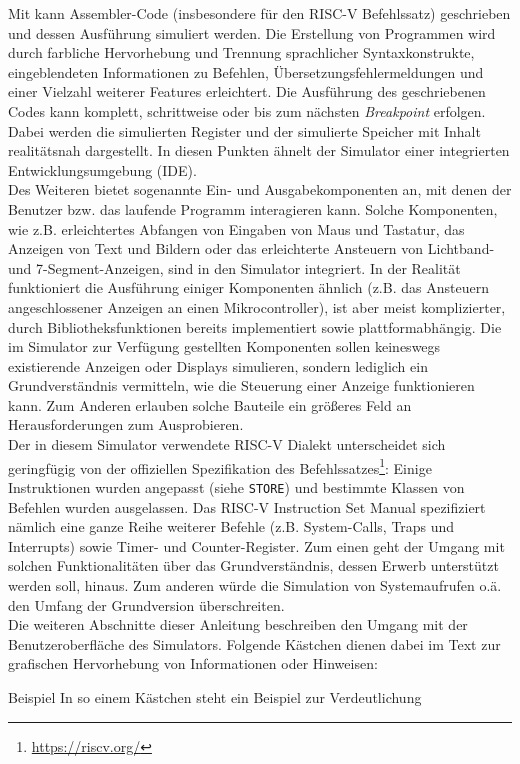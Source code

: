 Mit \erasim kann Assembler-Code (insbesondere für den RISC-V Befehlssatz)
geschrieben und dessen Ausführung simuliert werden. Die Erstellung von
Programmen wird durch farbliche Hervorhebung und Trennung sprachlicher
Syntaxkonstrukte, eingeblendeten Informationen zu Befehlen,
Übersetzungsfehlermeldungen und einer Vielzahl weiterer Features erleichtert.
Die Ausführung des geschriebenen Codes kann komplett, schrittweise oder bis zum
nächsten \emph{Breakpoint} erfolgen. Dabei werden die simulierten Register und
der simulierte Speicher mit Inhalt realitätsnah dargestellt. In diesen Punkten
ähnelt der Simulator einer integrierten Entwicklungsumgebung (IDE).\\
Des Weiteren bietet \erasim sogenannte Ein- und Ausgabekomponenten an, mit denen
der Benutzer bzw. das laufende Programm interagieren kann. Solche Komponenten,
wie z.B. erleichtertes Abfangen von Eingaben von Maus und Tastatur, das Anzeigen
von Text und Bildern oder das erleichterte Ansteuern von Lichtband- und
7-Segment-Anzeigen, sind in den Simulator integriert. In der Realität
funktioniert die Ausführung einiger Komponenten ähnlich (z.B. das Ansteuern
angeschlossener Anzeigen an einen Mikrocontroller), ist aber meist
komplizierter, durch Bibliotheksfunktionen bereits implementiert sowie
plattformabhängig. Die im Simulator zur Verfügung gestellten Komponenten sollen
keineswegs existierende Anzeigen oder Displays simulieren, sondern lediglich ein
Grundverständnis vermitteln, wie die Steuerung einer Anzeige funktionieren kann.
Zum Anderen erlauben solche Bauteile ein größeres Feld an Herausforderungen zum
Ausprobieren.\\ Der in diesem Simulator verwendete RISC-V Dialekt unterscheidet
sich geringfügig von der offiziellen Spezifikation des
Befehlssatzes\footnote{\url{https://riscv.org/}}: Einige Instruktionen wurden
angepasst (siehe \texttt{STORE}) und bestimmte Klassen von Befehlen wurden
ausgelassen. Das RISC-V Instruction Set Manual spezifiziert nämlich eine ganze
Reihe weiterer Befehle (z.B. System-Calls, Traps und Interrupts) sowie Timer-
und Counter-Register. Zum einen geht der Umgang mit solchen Funktionalitäten
über das Grundverständnis, dessen Erwerb unterstützt werden soll, hinaus. Zum
anderen würde die Simulation von Systemaufrufen o.ä. den Umfang der Grundversion
überschreiten.\\

Die weiteren Abschnitte dieser Anleitung beschreiben den Umgang mit der
Benutzeroberfläche des Simulators. Folgende Kästchen dienen dabei im Text zur
grafischen Hervorhebung von Informationen oder Hinweisen:
\begin{exampleblock}{Beispiel}
	In so einem Kästchen steht ein Beispiel zur Verdeutlichung
\end{exampleblock}

